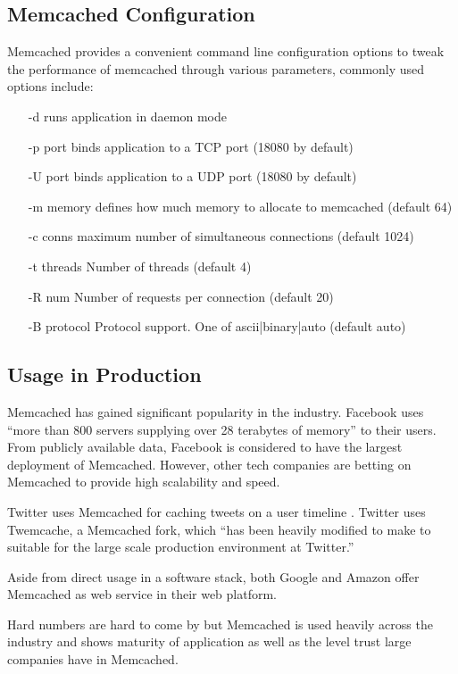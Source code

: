 \subsection{Memcached Configuration}
\label{sec:memcached_configuration}
Memcached provides a convenient command line configuration options to tweak the performance of memcached through various parameters, commonly used options include:
\begin{itemize}
    \item [-d] runs application in daemon mode
    \item [-p port] binds application to a TCP port (18080 by default)
    \item [-U port] binds application to a UDP port (18080 by default)
    \item [-m memory] defines how much memory to allocate to memcached (default 64)
    \item [-c conns] maximum number of simultaneous connections (default 1024)
    \item [-t threads] Number of threads (default 4)
    \item [-R num] Number of requests per connection (default 20)
    \item [-B protocol] Protocol support. One of ascii|binary|auto (default auto)
\end{itemize}

\subsection{Usage in Production}
Memcached has gained significant popularity in the industry. Facebook uses ``more than 800 servers supplying over 28 terabytes of memory'' \cite{scalingMemcachedAtFacebook} to their users. From publicly available data, Facebook is considered to have the largest deployment of Memcached. However, other tech companies are betting on Memcached to provide high scalability and speed.

Twitter uses Memcached for caching tweets on a user timeline \cite{twitterMemcached}. Twitter uses Twemcache, a Memcached fork, which ``has been heavily modified to make to suitable for the large scale production environment at Twitter.'' \cite{twemcache}

Aside from direct usage in a software stack, both Google \cite{googleCloudMemache} and Amazon \cite{awsMemcached} offer Memcached as web service in their web platform.

Hard numbers are hard to come by but Memcached is used heavily across the industry and shows maturity of application as well as the level trust large companies have in Memcached.


